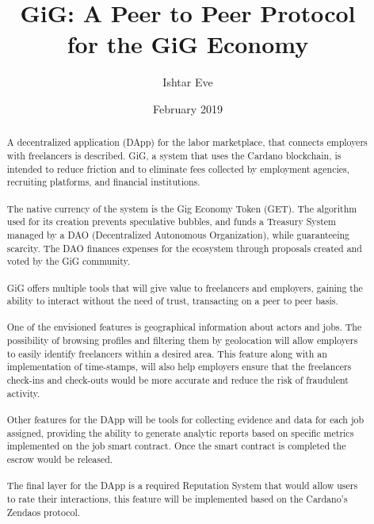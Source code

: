 \documentclass{article}
\title{GiG: A Peer to Peer Protocol \\for the GiG Economy}
\author{Ishtar Eve}
\date{February 2019}
\begin{document}
\maketitle

\begin{abstract}
A decentralized application (DApp) for the labor marketplace, that connects employers with freelancers is described. GiG, a system that uses the Cardano blockchain, is intended to reduce friction and to eliminate fees collected by employment agencies, recruiting platforms, and financial institutions.

\paragraph{} The native currency of the system is the Gig Economy Token (GET). The algorithm used for its creation prevents speculative bubbles, and funds a Treasury System managed by a DAO (Decentralized Autonomous Organization), while guaranteeing scarcity. The DAO finances expenses for the ecosystem through proposals created and voted by the GiG community.

\paragraph{} GiG offers multiple tools that will give value to freelancers and employers, gaining the ability to interact without the need of trust, transacting on a peer to peer basis.

\paragraph{} One of the envisioned features is geographical information about actors and jobs. The possibility of browsing profiles and filtering them by geolocation will allow employers to easily identify freelancers within a desired area. This feature along with an implementation of time-stamps, will also help employers ensure that the freelancers check-ins and check-outs would be more accurate and reduce the risk of fraudulent activity.

\paragraph{} Other features for the DApp will be tools for collecting evidence and data for each job assigned, providing the ability to generate analytic reports based on specific metrics implemented on the job smart contract. Once the smart contract is completed the escrow would be released.

\paragraph{} The final layer for the DApp is a required Reputation System that would allow users to rate their interactions, this feature will be implemented based on the Cardano's Zendaos protocol.

\end{abstract}
\end{document}
